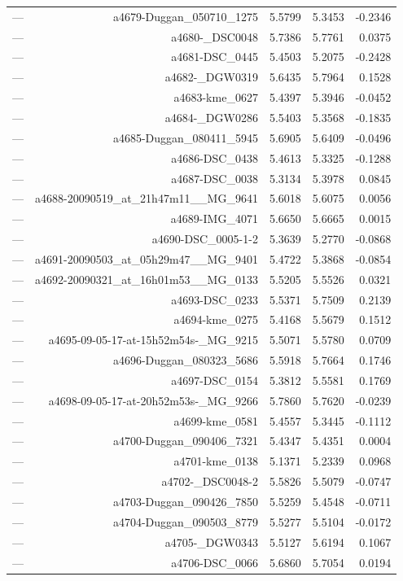 \begin{table}[htbp]
\begin{tabular}{lrrrr}
— & a4679-Duggan_050710_1275 & 5.5799 & 5.3453 & -0.2346 \\
— & a4680-_DSC0048 & 5.7386 & 5.7761 & 0.0375 \\
— & a4681-DSC_0445 & 5.4503 & 5.2075 & -0.2428 \\
— & a4682-_DGW0319 & 5.6435 & 5.7964 & 0.1528 \\
— & a4683-kme_0627 & 5.4397 & 5.3946 & -0.0452 \\
— & a4684-_DGW0286 & 5.5403 & 5.3568 & -0.1835 \\
— & a4685-Duggan_080411_5945 & 5.6905 & 5.6409 & -0.0496 \\
— & a4686-DSC_0438 & 5.4613 & 5.3325 & -0.1288 \\
— & a4687-DSC_0038 & 5.3134 & 5.3978 & 0.0845 \\
— & a4688-20090519_at_21h47m11__MG_9641 & 5.6018 & 5.6075 & 0.0056 \\
— & a4689-IMG_4071 & 5.6650 & 5.6665 & 0.0015 \\
— & a4690-DSC_0005-1-2 & 5.3639 & 5.2770 & -0.0868 \\
— & a4691-20090503_at_05h29m47__MG_9401 & 5.4722 & 5.3868 & -0.0854 \\
— & a4692-20090321_at_16h01m53__MG_0133 & 5.5205 & 5.5526 & 0.0321 \\
— & a4693-DSC_0233 & 5.5371 & 5.7509 & 0.2139 \\
— & a4694-kme_0275 & 5.4168 & 5.5679 & 0.1512 \\
— & a4695-09-05-17-at-15h52m54s-_MG_9215 & 5.5071 & 5.5780 & 0.0709 \\
— & a4696-Duggan_080323_5686 & 5.5918 & 5.7664 & 0.1746 \\
— & a4697-DSC_0154 & 5.3812 & 5.5581 & 0.1769 \\
— & a4698-09-05-17-at-20h52m53s-_MG_9266 & 5.7860 & 5.7620 & -0.0239 \\
— & a4699-kme_0581 & 5.4557 & 5.3445 & -0.1112 \\
— & a4700-Duggan_090406_7321 & 5.4347 & 5.4351 & 0.0004 \\
— & a4701-kme_0138 & 5.1371 & 5.2339 & 0.0968 \\
— & a4702-_DSC0048-2 & 5.5826 & 5.5079 & -0.0747 \\
— & a4703-Duggan_090426_7850 & 5.5259 & 5.4548 & -0.0711 \\
— & a4704-Duggan_090503_8779 & 5.5277 & 5.5104 & -0.0172 \\
— & a4705-_DGW0343 & 5.5127 & 5.6194 & 0.1067 \\
— & a4706-DSC_0066 & 5.6860 & 5.7054 & 0.0194 \\

\end{tabular}
\end{table}

